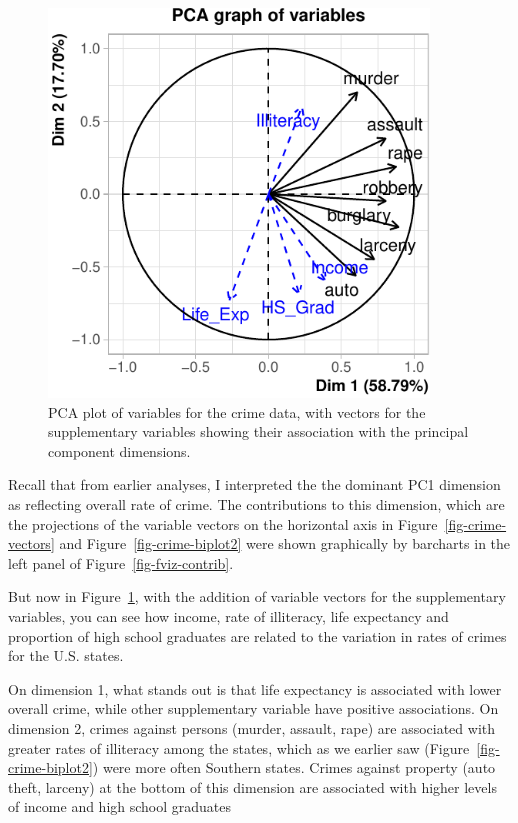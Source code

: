 \documentclass[
  letterpaper,
  10pt,
  krantz2]{krantz}
\begin{document}
\begin{figure}[H]

{\centering \includegraphics[width=0.9\textwidth,height=\textheight]{figs/ch04/fig-crime-factominer-1.pdf}

}

\caption{\label{fig-crime-factominer}PCA plot of variables for the crime
data, with vectors for the supplementary variables showing their
association with the principal component dimensions.}

\end{figure}

Recall that from earlier analyses, I interpreted the the dominant PC1
dimension as reflecting overall rate of crime. The contributions to this
dimension, which are the projections of the variable vectors on the
horizontal axis in Figure~\ref{fig-crime-vectors} and
Figure~\ref{fig-crime-biplot2} were shown graphically by barcharts in
the left panel of Figure~\ref{fig-fviz-contrib}.

But now in Figure~\ref{fig-crime-factominer}, with the addition of
variable vectors for the supplementary variables, you can see how
income, rate of illiteracy, life expectancy and proportion of high
school graduates are related to the variation in rates of crimes for the
U.S. states.

On dimension 1, what stands out is that life expectancy is associated
with lower overall crime, while other supplementary variable have
positive associations. On dimension 2, crimes against persons (murder,
assault, rape) are associated with greater rates of illiteracy among the
states, which as we earlier saw (Figure~\ref{fig-crime-biplot2}) were
more often Southern states. Crimes against property (auto theft,
larceny) at the bottom of this dimension are associated with higher
levels of income and high school graduates
\end{document}
